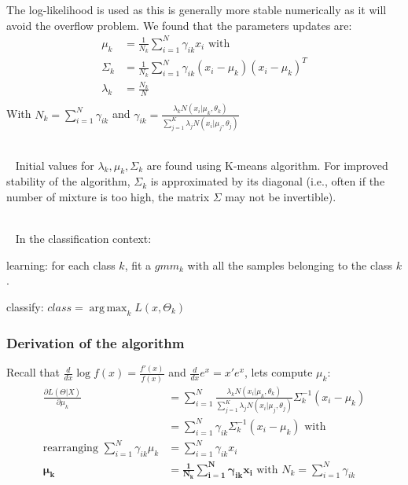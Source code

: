 \documentclass[11pt]{article}
\DeclareMathOperator*{\argmax}{arg\,max}
\begin{document}
The log-likelihood is used as this is generally more stable numerically as it will avoid the overflow problem. We found that the parameters updates are:
\begin{align*}
\mu _ k &= \frac{1}{N_k} \sum_{i=1}^N \gamma _{ik} x_i \text{~with~} \\
\Sigma _k &= \frac{1}{N_k} \sum _{i=1}^N \gamma _{ik}(x_i-\mu _k)(x_i-\mu _k)^T \\
\lambda _k &= \frac{N_k}{N} \\
\end{align*}
With $N_k = \sum _{i=1}^N \gamma _{ik}$ and $\gamma _{ik} = \frac{\lambda_k N(x_i| \mu _k, \theta _k)}{\sum _{j=1}^K \lambda _j N(x_i| \mu _j, \theta _j)}$

~\\~
Initial values for $\lambda_k, \mu_k, \Sigma_k$ are found using K-means algorithm. For improved stability of the algorithm, $\Sigma_k$ is approximated by its diagonal (i.e., often if the number of mixture is too high, the matrix $\Sigma$ may not be invertible).

~\\~
In the classification context:
\begin{compactitem}
\item learning: for each class $k$, fit a $gmm_k$ with all the samples belonging to the class $k$.
\item classify: $class=\argmax_k L(x,\Theta_k)$
\end{compactitem}

\subsubsection{Derivation of the algorithm}
Recall that $\frac{d}{dx} \log f(x) = \frac{f'(x)}{f(x)}$ and $\frac{d}{dx} e ^x=x' e^x$, lets compute $\mu _k$:
\begin{align}
\frac{\partial L(\Theta | X)}{\partial\mu _k} &=  \sum_{i=1}^N \frac{\lambda_k N(x_i| \mu _k, \theta _k)}{\sum _{j=1}^K \lambda _j N(x_i| \mu _j, \theta _j)} \Sigma _k^{-1} (x_i-\mu _k) \nonumber\\
&=  \sum_{i=1}^N \gamma _{ik} \Sigma _k^{-1} (x_i-\mu _k) \text{~with ~} \nonumber\\
\text{rearranging~} \sum_{i=1}^N \gamma _{ik} \mu _ k &= \sum_{i=1}^N \gamma _{ik} x_i \nonumber\\
\bm{\mu _ k} &= \bm{\frac{1}{N_k} \sum_{i=1}^N \gamma _{ik} x_i} \text{~with~} N_k = \sum _{i=1}^N \gamma _{ik}
\end{align}
\end{document}
